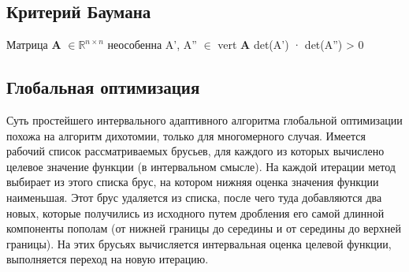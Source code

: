 \subsection{Критерий Баумана}
Матрица \textbf{A} $\in {\mathbb{R}}^{n \times n}$ неособенна \Leftrightarrow \forall A', A'' $\in$ vert \textbf{A} det(A') · det(A'') > 0 

\subsection{Глобальная оптимизация}
Суть простейшего интервального адаптивного алгоритма глобальной оптимизации похожа на алгоритм дихотомии, только для многомерного случая. Имеется рабочий список рассматриваемых брусьев, для каждого из которых вычислено целевое значение функции (в интервальном смысле). На каждой итерации метод выбирает из этого списка брус, на котором нижняя оценка значения функции наименьшая. Этот брус удаляется из списка, после чего туда добавляются два новых, которые получились из исходного путем дробления его самой длинной компоненты пополам (от нижней границы до середины и от середины до верхней границы). На этих брусьях вычисляется интервальная оценка целевой функции, выполняется переход на новую итерацию.
